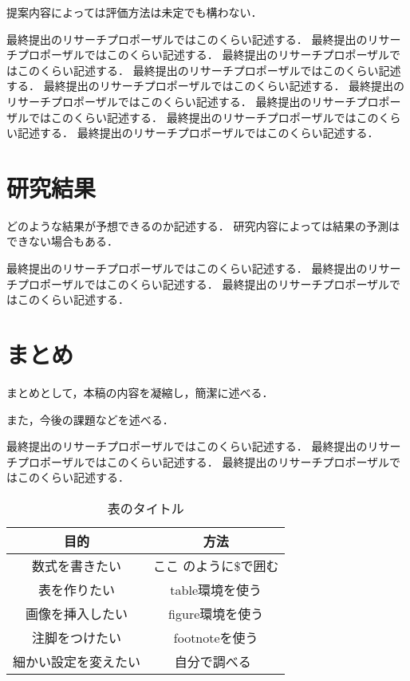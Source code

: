 \documentclass[twocolumn,article]{jlreq}
\begin{document}
提案内容によっては評価方法は未定でも構わない．

最終提出のリサーチプロポーザルではこのくらい記述する．
最終提出のリサーチプロポーザルではこのくらい記述する．
最終提出のリサーチプロポーザルではこのくらい記述する．
最終提出のリサーチプロポーザルではこのくらい記述する．
最終提出のリサーチプロポーザルではこのくらい記述する．
最終提出のリサーチプロポーザルではこのくらい記述する．
最終提出のリサーチプロポーザルではこのくらい記述する．
最終提出のリサーチプロポーザルではこのくらい記述する．
最終提出のリサーチプロポーザルではこのくらい記述する．


\section{研究結果}
どのような結果が予想できるのか記述する．
研究内容によっては結果の予測はできない場合もある．

最終提出のリサーチプロポーザルではこのくらい記述する．
最終提出のリサーチプロポーザルではこのくらい記述する．
最終提出のリサーチプロポーザルではこのくらい記述する．

\section{まとめ}
まとめとして，本稿の内容を凝縮し，簡潔に述べる．

また，今後の課題などを述べる．

最終提出のリサーチプロポーザルではこのくらい記述する．
最終提出のリサーチプロポーザルではこのくらい記述する．
最終提出のリサーチプロポーザルではこのくらい記述する．



\begin{table}[tbp]\centering\caption{表のタイトル}\label{tab:parameters}
  \begin{tabular}{c|c}\hline					%
    目的                 & 方法                    \\ \hline %
    数式を書きたい       & $ここ$ のように\$で囲む \\
    表を作りたい         & table環境を使う         \\
    画像を挿入したい     & figure環境を使う        \\
    注脚をつけたい       & footnoteを使う          \\
    細かい設定を変えたい & 自分で調べる~           \\
    \hline
  \end{tabular}
\end{table}
\end{document}
